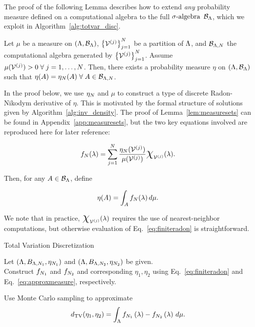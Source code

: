 The proof of the following Lemma describes how to extend {\em any} probability measure defined on a computational algebra to the full $\sigma\text{-algebra}$ $\mathcal{B}_{{\Lambda}}$, which we exploit in Algorithm~\ref{alg:totvar_disc}.

\begin{lem}
\label{lem:measuresets}
Let $\mu$ be a measure on $({\Lambda}, \mathcal{B}_{\Lambda})$, $\left\{\mathcal{V}^{(j)}\right\}_{j=1}^{N}$ be a partition of ${\Lambda}$, and $\mathcal{B}_{{\Lambda}, N}$ the computational algebra generated by $\left\{\mathcal{V}^{(j)}\right\}_{j=1}^{N}$.
Assume $\mu (\mathcal{V}^{(j)}) > 0 \; \forall \; j=1,\hdots, N$.
Then, there exists a probability measure $\eta$ on $({\Lambda}, \mathcal{B}_{\Lambda})$ such that $\eta(A) = \eta_N(A) \; \forall \; A\in\mathcal{B}_{{\Lambda}, N}$.
\end{lem}
In the proof below, we use $\eta_N$ and $\mu$ to construct a type of discrete Radon-Nikodym derivative of $\eta$.
This is motivated by the formal structure of solutions given by Algorithm~\ref{alg:inv_density}.
The proof of Lemma~\ref{lem:measuresets} can be found in Appendix~\ref{app:measuresets}, but the two key equations involved are reproduced here for later reference:

\begin{equation}\label{eq:finiteradon}
f_\nsamps (\param) = \sum_{j=1}^{\nsamps} \frac{\eta_\nsamps (\VV^{(j)}) }{\mu (\VV^{(j)})} \Chi_{\VV^{(j)}} (\param).
\end{equation}

Then, for any $A\in\mathcal{B}_{\Lambda}$, define

\begin{equation}\label{eq:approxmeasure}
\eta (A) = \int_A f_N (\lambda) \, d\mu.
\end{equation}

We note that in practice, $\Chi_{\VV^{(j)}} (\param)$ requires the use of nearest-neighbor computations, but otherwise evaluation of Eq.~\eqref{eq:finiteradon} is straightforward.


\begin{algorithm}
\DontPrintSemicolon
\caption{Total Variation Discretization}
\label{alg:totvar_disc}
Let $({\Lambda}, B_{{\Lambda}, N_1}, \eta_{N_1} )$ and $({\Lambda}, B_{{\Lambda}, N_2}, \eta_{N_2} )$ be given.\\

Construct $f_{N_1}$ and $f_{N_2}$ and corresponding $\eta_1, \eta_2$ using Eq.~\eqref{eq:finiteradon} and Eq.~\eqref{eq:approxmeasure}, respectively.

Use Monte Carlo sampling to approximate
$$d_\text{TV}(\eta_1, \eta_2) = \int_{\Lambda} f_{N_1}\left ( \lambda \right ) - f_{N_2}\left ( \lambda \right ) \, d\mu.$$
\end{algorithm}

